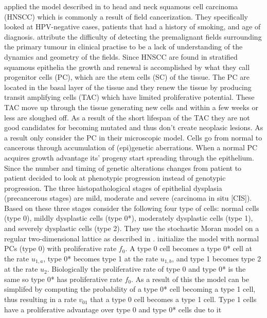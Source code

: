\documentclass[\main/thesis.tex]{subfiles}
\begin{document}
\textcite{Ryser} applied the model described in \textcite{Foo} to head and neck 
squamous cell carcinoma (HNSCC) which is commonly a result of field 
cancerization. They specifically looked at HPV-negative cases, patients that 
had a history of smoking, and age of diagnosis. \textcite{Ryser} attribute the 
difficulty of detecting the premalignant fields surrounding the primary tumour 
in clinical practise to be a lack of understanding of the dynamics and geometry 
of the fields. Since HNSCC are found in stratified squamous epithelia the growth 
and renewal is accomplished by what they call progenitor cells (PC), which are 
the stem cells (SC) of the tissue. The PC are located in the basal layer of the 
tissue and they renew the tissue by producing transit amplifying cells (TAC) 
which have limited proliferative potential. These TAC move up through the tissue 
generating new cells and within a few weeks or less are sloughed off. As a 
result of the short lifespan of the TAC they are not good candidates for 
becoming mutated and thus don't create neoplasic lesions. As a result 
\textcite{Ryser} only consider the PC in their microscopic model. Cells go from 
normal to cancerous through accumulation of (epi)genetic aberrations. When a 
normal PC acquires growth advantage its' progeny start spreading through the 
epithelium. Since the number and timing of genetic alterations changes from 
patient to patient \textcite{Ryser} decided to look at phenotypic progression 
instead of genotypic progression. The three histopathological stages 
of epithelial dysplasia (precancerous stages) are mild, moderate and severe 
(carcinoma in situ [CIS]). Based on these three stages \textcite{Ryser} consider 
the following four type of cells: normal cells (type 0), mildly dysplastic cells 
(type 0*), moderately dysplastic cells (type 1), and severely dysplastic cells 
(type 2). They use the stochastic Moran model on a regular two-dimensional 
lattice as described in \textcite{Foo}. \textcite{Ryser} initialize 
the model with normal PCs (type 0) with proliferative rate $f_0$. A type 0 cell 
becomes a type 0* cell at the rate $u_{1, a}$, type 0* becomes type 1 at the 
rate $u_{1, b}$, and type 1 becomes type 2 at the rate $u_2$. Biologically the 
proliferative rate of type 0 and type 0* is the same so type 0* has 
proliferative rate $f_0$. As a result of this the model can be simplifed by 
computing the probability of a type 0* cell becoming a type 1 cell, thus 
resulting in a rate $v_{01}$ that a type 0 cell becomes a type 1 cell. Type 1 
cells have a proliferative advantage over type 0 and type 0* cells due to it 
\end{document}

